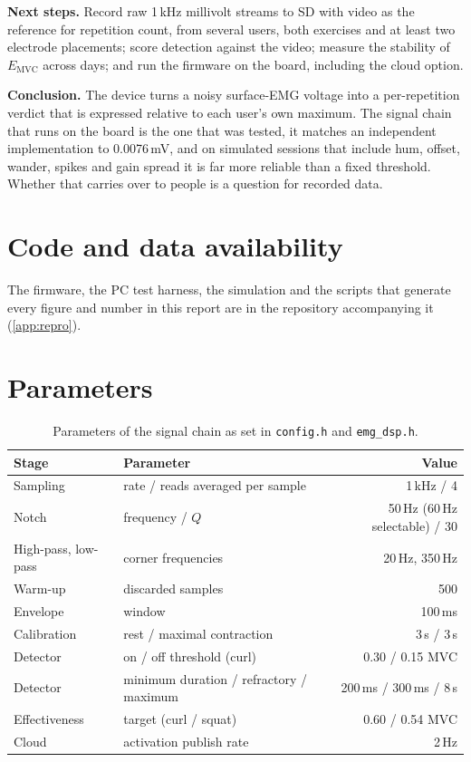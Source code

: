 \documentclass[11pt,letterpaper]{article}
\begin{document}
\textbf{Next steps.} Record raw 1\,kHz millivolt streams to SD with video as the reference for repetition count, from several users, both exercises and at least two electrode placements; score detection against the video; measure the stability of $E_{\mathrm{MVC}}$ across days; and run the firmware on the board, including the cloud option.

\textbf{Conclusion.} The device turns a noisy surface-EMG voltage into a per-repetition verdict that is expressed relative to each user's own maximum. The signal chain that runs on the board is the one that was tested, it matches an independent implementation to 0.0076\,mV, and on simulated sessions that include hum, offset, wander, spikes and gain spread it is far more reliable than a fixed threshold. Whether that carries over to people is a question for recorded data.

\section*{Code and data availability}
The firmware, the PC test harness, the simulation and the scripts that generate every figure and number in this report are in the repository accompanying it (\cref{app:repro}).




\appendix
\section{Parameters}
\begin{table}[H]\centering\small
\begin{tabular}{@{}llr@{}}\toprule
Stage & Parameter & Value\\\midrule
Sampling & rate / reads averaged per sample & 1\,kHz / 4\\
Notch & frequency / $Q$ & 50\,Hz (60\,Hz selectable) / 30\\
High-pass, low-pass & corner frequencies & 20\,Hz, 350\,Hz\\
Warm-up & discarded samples & 500\\
Envelope & window & 100\,ms\\
Calibration & rest / maximal contraction & 3\,s / 3\,s\\
Detector & on / off threshold (curl) & 0.30 / 0.15 MVC\\
Detector & minimum duration / refractory / maximum & 200\,ms / 300\,ms / 8\,s\\
Effectiveness & target (curl / squat) & 0.60 / 0.54 MVC\\
Cloud & activation publish rate & 2\,Hz\\\bottomrule
\end{tabular}
\caption{Parameters of the signal chain as set in \texttt{config.h} and \texttt{emg\_dsp.h}.}
\end{table}
\end{document}
